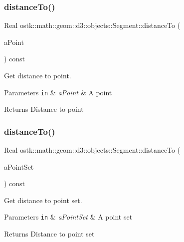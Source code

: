 \subsubsection{\texorpdfstring{distance\+To()}{distanceTo()}\hspace{0.1cm}{\footnotesize\ttfamily [1/2]}}
{\footnotesize\ttfamily Real ostk\+::math\+::geom\+::d3\+::objects\+::\+Segment\+::distance\+To (\begin{DoxyParamCaption}\item[{const \hyperlink{classostk_1_1math_1_1geom_1_1d3_1_1objects_1_1_point}{Point} \&}]{a\+Point }\end{DoxyParamCaption}) const}



Get distance to point. 


\begin{DoxyParams}[1]{Parameters}
\mbox{\tt in}  & {\em a\+Point} & A point \\
\hline
\end{DoxyParams}
\begin{DoxyReturn}{Returns}
Distance to point 
\end{DoxyReturn}
\mbox{\label{classostk_1_1math_1_1geom_1_1d3_1_1objects_1_1_segment_ade8414dc47f495917f43012f78e30017}} 
\subsubsection{\texorpdfstring{distance\+To()}{distanceTo()}\hspace{0.1cm}{\footnotesize\ttfamily [2/2]}}
{\footnotesize\ttfamily Real ostk\+::math\+::geom\+::d3\+::objects\+::\+Segment\+::distance\+To (\begin{DoxyParamCaption}\item[{const \hyperlink{classostk_1_1math_1_1geom_1_1d3_1_1objects_1_1_point_set}{Point\+Set} \&}]{a\+Point\+Set }\end{DoxyParamCaption}) const}



Get distance to point set. 


\begin{DoxyParams}[1]{Parameters}
\mbox{\tt in}  & {\em a\+Point\+Set} & A point set \\
\hline
\end{DoxyParams}
\begin{DoxyReturn}{Returns}
Distance to point set 
\end{DoxyReturn}
\mbox{\label{classostk_1_1math_1_1geom_1_1d3_1_1objects_1_1_segment_a7d37a80e12053ec307dfd8e4d3973843}} 
